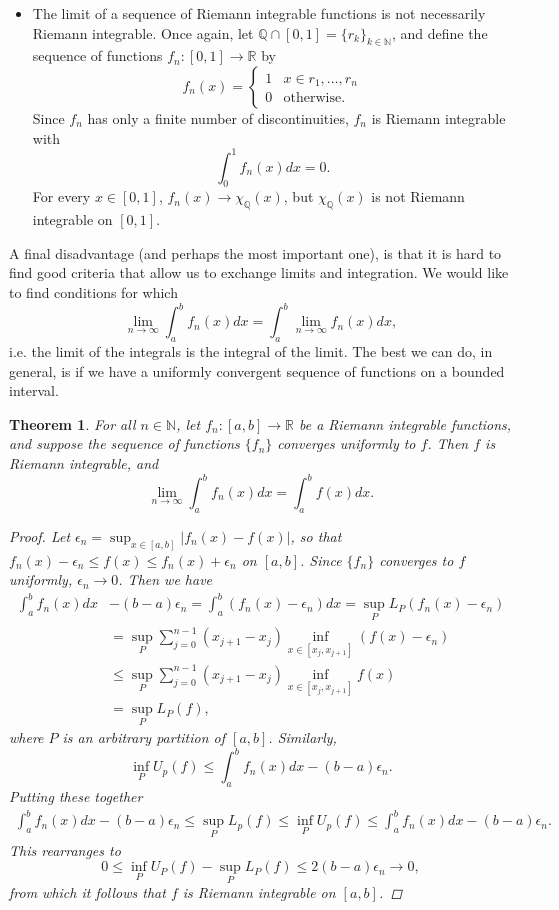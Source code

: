 \documentclass[12pt]{amsart}         %
\newtheorem{theorem}{Theorem}[section]
\theoremstyle{remark}
\newcommand{\N}{\mathbb{N}}
\newcommand{\R}{\mathbb{R}}
\newcommand{\Q}{\mathbb{Q}}
\begin{document}
\begin{itemize}
    \item The limit of a sequence of Riemann integrable functions is not necessarily Riemann integrable. Once again, let $\Q \cap [0, 1] = \{ r_k \}_{k \in \N}$, and define the sequence of functions $f_n: [0, 1] \rightarrow \R$ by
    \[
    f_n(x) = \begin{cases}
    1 & x \in {r_1, \dots, r_n} \\
    0 & \text{otherwise}.
    \end{cases}
    \]
    Since $f_n$ has only a finite number of discontinuities, $f_n$ is Riemann integrable with
    \[
    \int_0^1 f_n(x) dx = 0.
    \]
    For every $x \in [0, 1]$, $f_n(x) \rightarrow \chi_\Q(x)$, but $\chi_\Q(x)$ is not Riemann integrable on $[0, 1]$.
\end{itemize}

A final disadvantage (and perhaps the most important one), is that it is hard to find good criteria that allow us to exchange limits and integration. We would like to find conditions for which
\[
\lim_{n\rightarrow\infty}\int_a^b f_n(x) dx = \int_a^b \lim_{n\rightarrow\infty} f_n(x) dx,
\]
i.e. the limit of the integrals is the integral of the limit. The best we can do, in general, is if we have a uniformly convergent sequence of functions on a bounded interval.

\begin{theorem}
For all $n \in \N$, let $f_n: [a, b] \rightarrow \R$ be a Riemann integrable functions, and suppose the sequence of functions $\{f_n\}$ converges uniformly to $f$. Then $f$ is Riemann integrable, and
 \[
\lim_{n\rightarrow\infty}\int_a^b f_n(x) dx = \int_a^b f(x) dx.
\]
\begin{proof}
Let $\epsilon_n = \sup_{x \in [a, b]}|f_n(x) - f(x)|$, so that $f_n(x) - \epsilon_n \leq f(x) \leq f_n(x) + \epsilon_n$ on $[a, b]$. Since $\{f_n\}$ converges to $f$ uniformly, $\epsilon_n \rightarrow 0$. Then we have
\begin{align*}
\int_a^b f_n(x) dx &- (b-a)\epsilon_n = 
\int_a^b (f_n(x) - \epsilon_n) dx = \sup_P L_P(f_n(x) -\epsilon_n) \\
&= \sup_P \sum_{j = 0}^{n-1} (x_{j+1} - x_j) \inf_{x \in [x_j, x_{j+1}]} (f(x) - \epsilon_n) \\
&\leq \sup_P \sum_{j = 0}^{n-1} (x_{j+1} - x_j) \inf_{x \in [x_j, x_{j+1}]} f(x) \\
&= \sup_P L_P(f),
\end{align*}
where $P$ is an arbitrary partition of $[a,b]$. Similarly,
\[
\inf_P U_p(f) \leq \int_a^b f_n(x) dx - (b-a)\epsilon_n.
\]
Putting these together
\begin{align*}
\int_a^b f_n(x) dx - (b-a)\epsilon_n \leq \sup_P L_p(f) \leq \inf_P U_p(f) \leq \int_a^b f_n(x) dx - (b-a)\epsilon_n.
\end{align*}
This rearranges to
\[
0 \leq \inf_P U_P(f) - \sup_P L_P(f) \leq 2(b-a)\epsilon_n \rightarrow 0,
\]
from which it follows that $f$ is Riemann integrable on $[a,b]$.
\end{proof}
\end{theorem}
\end{document}
